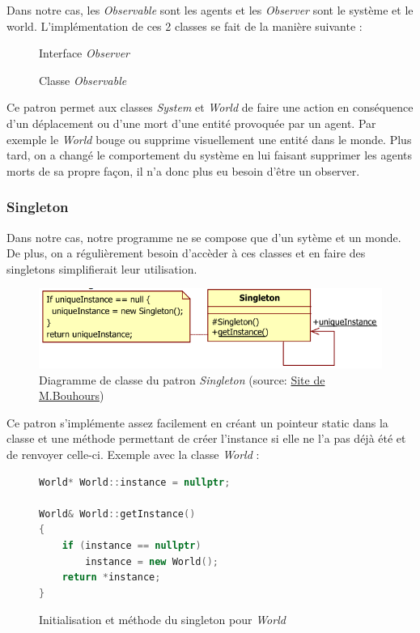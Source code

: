 \documentclass{article}
\begin{document}
Dans notre cas, les \emph{Observable} sont les agents et les \emph{Observer} sont le système et le world.
L'implémentation de ces 2 classes se fait de la manière suivante :
\begin{figure}[!h]
  \centering
  \caption{Interface \emph{Observer}}
  
\end{figure}

\begin{figure}[!h]
  \centering
  \caption{Classe \emph{Observable}}
  
\end{figure}

Ce patron permet aux classes \emph{System} et \emph{World} de faire une action en conséquence d'un déplacement
ou d'une mort d'une entité provoquée par un agent. Par exemple le \emph{World} bouge ou supprime visuellement
une entité dans le monde. Plus tard, on a changé le comportement du système en lui faisant supprimer les agents
morts de sa propre façon, il n'a donc plus eu besoin d'être un observer.

\subsubsection{Singleton}
Dans notre cas, notre programme ne se compose que d'un sytème et un monde. De plus, on a régulièrement besoin
d'accèder à ces classes et en faire des singletons simplifierait leur utilisation.
\begin{figure}[!h]
  \centering
  \caption{Diagramme de classe du patron \emph{Singleton} (source: \href{http://www.goprod.bouhours.net/?page=pattern&pat_id=19}{Site de M.Bouhours})}
  \includegraphics[scale=0.7]{img/singleton.png}
\end{figure}

Ce patron s'implémente assez facilement en créant un pointeur static dans la classe et
une méthode permettant de créer l'instance si elle ne l'a pas déjà été et de renvoyer
celle-ci. Exemple avec la classe \emph{World} :
\begin{figure}[!h]
  \centering
  \caption{Initialisation et méthode du singleton pour \emph{World}}
  \begin{lstlisting}[language=c++]
World* World::instance = nullptr;

World& World::getInstance()
{
    if (instance == nullptr)
        instance = new World();
    return *instance;
}
\end{lstlisting}
\end{figure}
\end{document}
